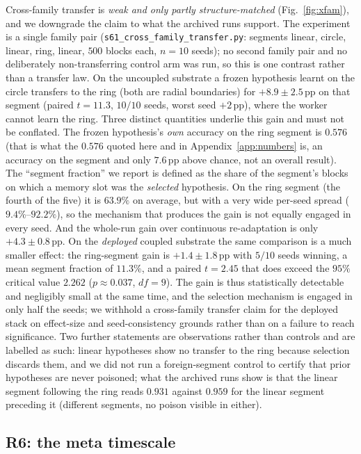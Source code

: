 \documentclass[preprint,12pt]{elsarticle}
\begin{document}
Cross-family transfer is \emph{weak and only partly structure-matched}
(Fig.~\ref{fig:xfam}), and we downgrade the claim to what the archived runs
support. The experiment is a single family pair
(\texttt{s61\_cross\_family\_transfer.py}: segments linear, circle, linear,
ring, linear, $500$ blocks each, $n=10$ seeds); no second family pair and no
deliberately non-transferring control arm was run, so this is one contrast
rather than a transfer law. On the uncoupled substrate a frozen hypothesis
learnt on the circle transfers to the ring (both are radial boundaries)
for $+8.9\pm2.5$\,pp on that segment (paired $t=11.3$, $10/10$ seeds, worst
seed $+2$\,pp), where the worker cannot learn the ring. Three distinct
quantities underlie this gain and must not be conflated. The
frozen hypothesis's \emph{own} accuracy on the ring segment is $0.576$
(that is what the $0.576$ quoted here and in Appendix~\ref{app:numbers} is, an
accuracy on the segment and only $7.6$\,pp above chance, not an overall
result). The ``segment fraction'' we report is defined as the share of the
segment's blocks on which a memory slot was the \emph{selected} hypothesis. On
the ring segment (the fourth of the five) it is $63.9\%$ on average, but with a very wide per-seed spread
($9.4\%$--$92.2\%$), so the mechanism that produces the gain is not equally
engaged in every seed. And the whole-run gain over continuous re-adaptation is
only $+4.3\pm0.8$\,pp. On the \emph{deployed} coupled substrate the same
comparison is a much smaller effect: the ring-segment gain is
$+1.4\pm1.8$\,pp with $5/10$ seeds winning, a mean segment fraction of
$11.3\%$, and a paired $t=2.45$ that does exceed the $95\%$ critical value
$2.262$ ($p\approx0.037$, $df=9$). The gain is thus statistically detectable
and negligibly small at the same time, and the selection mechanism is engaged
in only half the seeds; we withhold a cross-family transfer claim for the
deployed stack on effect-size and seed-consistency grounds rather than on a
failure to reach significance. Two further statements are observations
rather than controls and are labelled as such: linear hypotheses show no
transfer to the ring because selection discards them, and we did not run a
foreign-segment control to certify that prior hypotheses are never poisoned; what the archived runs show is that the linear segment following the ring
reads $0.931$ against $0.959$ for the linear segment preceding it (different
segments, no poison visible in either).

\subsection{R6: the meta timescale}
\label{sec:r6}
\end{document}
